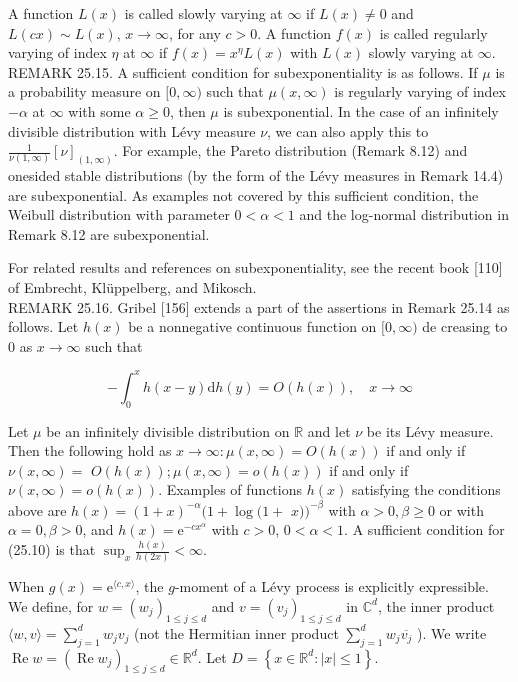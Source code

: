 \documentclass[a4paper,11pt]{article}
\begin{document}
A function $L(x)$ is called slowly varying at $\infty$ if $L(x) \neq 0$ and $L(c x) \sim L(x)$, $x \rightarrow \infty$,
for any $c>0$. A function $f(x)$ is called regularly varying of index $\eta$ at $\infty$ if $f(x)=x^{\eta} L(x)$ with $L(x)$
slowly varying at $\infty$. \\

REMARK 25.15. A sufficient condition for subexponentiality is as follows. If $\mu$ is a probability
measure on $[0, \infty)$ such that $\mu(x, \infty)$ is regularly varying of index $-\alpha$ at $\infty$
with some $\alpha \geq 0$, then $\mu$ is subexponential. In the case of an infinitely divisible distribution
with Lévy measure $\nu$, we can also apply this to $\frac{1}{\nu(1, \infty)}[\nu]_{(1, \infty)}$. For example,
the Pareto distribution (Remark 8.12) and onesided stable distributions (by the form of the Lévy measures in Remark 14.4)
are subexponential. As examples not covered by this sufficient condition, the Weibull distribution with parameter $0<\alpha<1$
and the log-normal distribution in Remark 8.12 are subexponential.

For related results and references on subexponentiality, see the recent book [110] of Embrecht, Klüppelberg, and Mikosch.\\

REMARK 25.16. Gribel [156] extends a part of the assertions in Remark 25.14 as follows. Let $h(x)$ be a
nonnegative continuous function on $[0, \infty)$ de creasing to 0 as $x \rightarrow \infty$ such that

\begin{equation*}
    -\int_{0}^{x} h(x-y) \mathrm{d} h(y)=O(h(x)), \quad x \rightarrow \infty \tag{25.10}
\end{equation*}

Let $\mu$ be an infinitely divisible distribution on $\mathbb{R}$ and let $\nu$ be its Lévy measure.
Then the following hold as $x \rightarrow \infty: \mu(x, \infty)=O(h(x))$ if and only
if $\nu(x, \infty)=$ $O(h(x)) ; \mu(x, \infty)=o(h(x))$ if and only if $\nu(x, \infty)=o(h(x))$.
Examples of functions $h(x)$ satisfying the conditions above are $h(x)=(1+x)^{-\alpha}(1+\log (1+$ $x))^{-\beta}$
with $\alpha>0, \beta \geq 0$ or with $\alpha=0, \beta>0$, and $h(x)=\mathrm{e}^{-c x^{\alpha}}$ with $c>0$, $0<\alpha<1$.
A sufficient condition for (25.10) is that $\sup _{x} \frac{h(x)}{h(2 x)}<\infty$.

When $g(x)=\mathrm{e}^{\langle c, x\rangle}$, the $g$-moment of a Lévy process is explicitly expressible.
We define, for $w=\left(w_{j}\right)_{1 \leq j \leq d}$ and $v=\left(v_{j}\right)_{1 \leq j \leq d}$ in $\mathbb{C}^{d}$,
the inner product $\langle w, v\rangle=\sum_{j=1}^{d} w_{j} v_{j}$ (not the Hermitian
inner product $\sum_{j=1}^{d} w_{j} \overline{v_{j}}$ ).
We write $\operatorname{Re} w=\left(\operatorname{Re} w_{j}\right)_{1 \leq j \leq d} \in \mathbb{R}^{d}$. Let $D=\left\{x \in \mathbb{R}^{d}:|x| \leq 1\right\}$. \\
\end{document}
